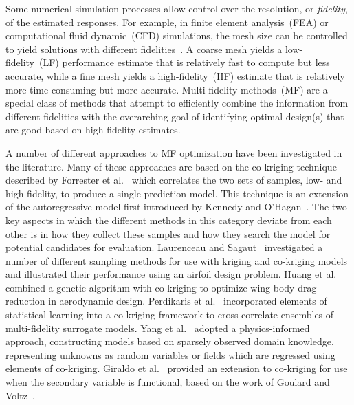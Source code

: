 Some numerical simulation processes allow control over the resolution, or \emph{fidelity}, of the estimated responses. For example, in finite element analysis~(FEA) or computational fluid dynamic~(CFD) simulations, the mesh size can be controlled to yield solutions with different fidelities~\cite{branke2016efficient,toal2015some}. A coarse mesh yields a low-fidelity~(LF) performance estimate that is relatively fast to compute but less accurate, while a fine mesh yields a high-fidelity~(HF) estimate that is relatively more time consuming but more accurate. Multi-fidelity  methods~(MF) are a special class of methods that attempt to efficiently combine the information from different fidelities with the overarching goal of identifying optimal design(s) that are good based on high-fidelity estimates. 

A number of different approaches to MF optimization have been investigated in the literature. Many of these approaches are based on the co-kriging technique described by Forrester et al.~\cite{forrester2007multi} which correlates the two sets of samples, low- and high-fidelity, to produce a single prediction model. This technique is an extension of the autoregressive model first introduced by Kennedy and O'Hagan~\cite{kennedy2000predicting}. The two key aspects in which the different methods in this category deviate from each other is in how they collect these samples and how they search the model for potential candidates for evaluation. Laurenceau and Sagaut~\cite{laurenceau2008building} investigated a number of different sampling methods for use with kriging and co-kriging models and illustrated their performance using an airfoil design problem. Huang et al.~\cite{huang2013research} combined a genetic algorithm with co-kriging to optimize wing-body drag reduction in aerodynamic design. Perdikaris et al.~\cite{perdikaris2015multi} incorporated elements of statistical learning into a co-kriging framework to cross-correlate ensembles of multi-fidelity surrogate models. Yang et al.~\cite{yang2019physics} adopted a physics-informed approach, constructing models based on sparsely observed domain knowledge, representing unknowns as random variables or fields which are regressed using elements of co-kriging. Giraldo et al.~\cite{giraldo2020cokriging} provided an extension to co-kriging for use when the secondary variable is functional, based on the work of Goulard and Voltz~\cite{goulard1993geostatistical}.

